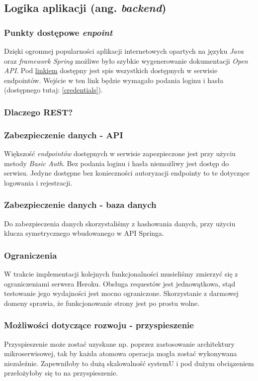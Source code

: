 \subsection{Logika aplikacji (ang. \textit{backend})}
\subsubsection{Punkty dostępowe \textit{enpoint}}
Dzięki ogromnej popularności aplikacji internetowych opartych na języku \textit{Java} oraz \textit{framework Spring} możliwe było szybkie wygenerowanie dokumentacji \textit{Open API}. Pod \href{https://trunk-kartapacjentaservice.herokuapp.com/swagger-ui.html} {linkiem} dostępny jest spis wszystkich dostępnych w serwisie endpointów. Wejście w ten link będzie wymagało podania loginu i hasła (dostępnego tutaj: \ref{credentials}).

\clearpage
\subsubsection{Dlaczego REST?}


\subsubsection{Zabezpieczenie danych - API}
Większość \textit{endpointów} dostępnych w serwisie zapezpieczone jest przy użyciu metody \textit{Basic Auth}. Bez podania loginu i hasła niemożliwy jest dostęp do serwisu. Jedyne dostępne bez konieczności autoryzacji endpointy to te dotyczące logowania i rejestracji.

\subsubsection{Zabezpieczenie danych - baza danych}
Do zabezpieczenia danych skorzystaliśmy z hashowania danych, przy użyciu klucza symetrycznego wbudowanego w API Springa.

\subsubsection{Ograniczenia}
W trakcie implementacji kolejnych funkcjonalności musieliśmy zmierzyć się z ograniczeniami serwera Heroku. Obsługa requestów jest jednowątkowa, stąd testowanie jego wydajności jest mocno ograniczone.
Skorzystanie z darmowej domeny sprawia, że funkcjonowanie strony jest po prostu wolne.

\subsubsection{Możliwości dotyczące rozwoju - przyspieszenie}
Przyspieszenie może zostać uzyskane np. poprzez zastosowanie architektury mikroserwisowej, tak by każda atomowa operacja mogła zostać wykonywana niezaleźnie. Zapewniłoby to dużą skalowalność systemU i pod dużym obciązeniem przełożyłoby się to na przyspieszenie. 

\todo


